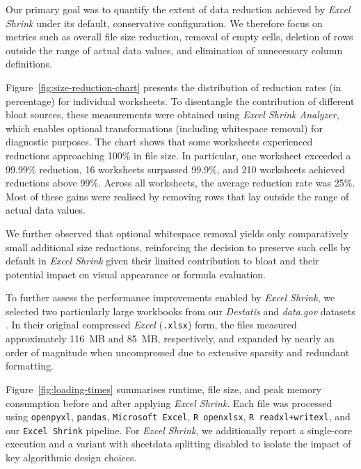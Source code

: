\documentclass[conference]{IEEEtran}
\begin{document}
Our primary goal was to quantify the extent of data reduction achieved by
\textit{Excel Shrink} under its default, conservative configuration.
We therefore focus on metrics such as overall file size reduction,
removal of empty cells,
deletion of rows outside the range of actual data values,
and elimination of unnecessary column definitions.

Figure~\ref{fig:size-reduction-chart} presents the distribution of reduction rates
(in percentage) for individual worksheets.
To disentangle the contribution of different bloat sources,
these measurements were obtained using \textit{Excel Shrink Analyzer},
which enables optional transformations (including whitespace removal)
for diagnostic purposes.
The chart shows that some worksheets experienced reductions approaching 100\%
in file size.
In particular, one worksheet exceeded a 99.99\% reduction,
16 worksheets surpassed 99.9\%,
and 210 worksheets achieved reductions above 99\%.
Across all worksheets, the average reduction rate was 25\%.
Most of these gains were realised by removing rows that lay outside
the range of actual data values.

We further observed that optional whitespace removal yields only
comparatively small additional size reductions,
reinforcing the decision to preserve such cells by default in
\textit{Excel Shrink} given their limited contribution to bloat
and their potential impact on visual appearance or formula evaluation.

To further assess the performance improvements enabled by \textit{Excel Shrink}, we selected two particularly large workbooks from our \textit{Destatis} and \textit{data.gov} datasets \cite{destatis2023Rechnungsergebnisse, Hazari2015DobutamineQTdata}. In their original compressed \textit{Excel} (\texttt{.xlsx}) form, the files measured approximately 116~MB and 85~MB, respectively, and expanded by nearly an order of magnitude when uncompressed due to extensive sparsity and redundant formatting.

Figure~\ref{fig:loading-times} summarises runtime, file size, and peak memory
consumption before and after applying \textit{Excel Shrink}. Each file was
processed using \texttt{openpyxl}, \texttt{pandas}, \texttt{Microsoft~Excel},
\texttt{R~openxlsx}, \texttt{R~readxl+writexl}, and our \texttt{Excel~Shrink}
pipeline. For \textit{Excel Shrink}, we additionally report a single-core
execution and a variant with sheetdata splitting disabled to isolate the impact
of key algorithmic design choices.
\end{document}
